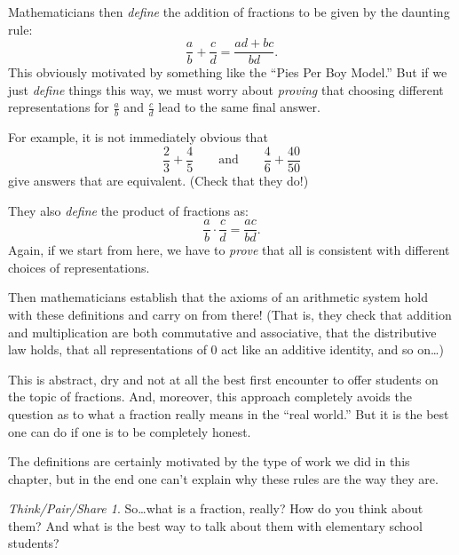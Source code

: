 \documentclass[10pt, reqno]{amsart}
\theoremstyle{remark}
\newtheorem*{thinkpair*}{Think/Pair/Share}
\theoremstyle{definition}
\numberwithin{equation}{section}  %
\begin{document}
Mathematicians then \emph{define} the addition of fractions to be given by the daunting rule:
\[
\frac a b + \frac c d = 
\frac{ad +bc}{bd}.
\]
This obviously motivated by something like the ``Pies Per Boy Model.''   But if we just \emph{define} things this way, we must worry
about \emph{proving} that choosing different representations for $\frac a b$ and $\frac c d$
lead to the same
final answer. 

For example, it is not immediately obvious that
\[
\frac 2 3 + \frac 4 5
\qquad
\text{and}
\qquad 
\frac 4 6 + \frac{40}{50}
\]
give
answers that are equivalent.  (Check that they do!)

They also \emph{define} the product of fractions as:
\[
\frac a b \cdot \frac cd = \frac{ac}{bd}.
\]
Again, if we start from here, we have to \emph{prove} that all is
consistent with different choices of representations.

Then mathematicians establish that the axioms of an arithmetic system hold with these
definitions and carry on from there!  (That is, they check that addition and multiplication are both commutative and associative, that the distributive law holds, that all representations of 0 act like an additive identity, and so on\dots)

This is abstract, dry and not at all the best first encounter to offer students on the topic of
fractions. And, moreover, this approach completely avoids the question as to what a
fraction really means in the ``real world.'' But it is the best one can do if one is to be
completely honest. 

The definitions are certainly motivated by the type of work we did in this chapter, but in the end one can't explain why these rules are the way they are.

\begin{thinkpair*}
So\dots what is a fraction, really?  How do you think about them?  And what is the best way to talk about them with elementary school students?
\end{thinkpair*}
\end{document}
